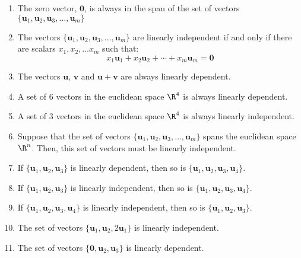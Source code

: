 \documentclass[12pt]{article}
\begin{document}
\begin{enumerate}
\item The zero vector, $\mathbf{0}$, is always in the span of the set of vectors $\{\mathbf{u}_1, \mathbf{u}_2, \mathbf{u}_3,\ldots ,\mathbf{u}_m\}$

\item The vectors $\{\mathbf{u}_1, \mathbf{u}_2, \mathbf{u}_3,\ldots ,\mathbf{u}_m\}$ are linearly independent if and only if there are scalars $x_1, x_2,\ldots x_m$ such that:
\[
x_1\mathbf{u}_1+x_2\mathbf{u}_2+\cdots+x_m\mathbf{u}_m=\mathbf{0}
\]

\item The vectors $\mathbf{u}$, $\mathbf{v}$ and $\mathbf{u}+\mathbf{v}$ are always linearly dependent.

\item A set of $6$ vectors in the euclidean space $\R^4$ is always linearly dependent.

\item A set of $3$ vectors in the euclidean space $\R^4$ is always linearly independent. 

\item Suppose that the set of vectors $\{\mathbf{u}_1, \mathbf{u}_2, \mathbf{u}_3,\ldots ,\mathbf{u}_m\}$ spans the euclidean space $\R^n$. Then, this set of vectors must be linearly independent.

\item If $\{\mathbf{u}_1, \mathbf{u}_2, \mathbf{u}_3\}$ is linearly dependent, then so is $\{\mathbf{u}_1, \mathbf{u}_2, \mathbf{u}_3, \mathbf{u}_4\}$.

\item If $\{\mathbf{u}_1, \mathbf{u}_2, \mathbf{u}_3\}$ is linearly independent, then so is $\{\mathbf{u}_1, \mathbf{u}_2, \mathbf{u}_3, \mathbf{u}_4\}$.

\item If $\{\mathbf{u}_1, \mathbf{u}_2, \mathbf{u}_3, \mathbf{u}_4\}$
is linearly independent, then so is $\{\mathbf{u}_1, \mathbf{u}_2, \mathbf{u}_3\}$.

\item The set of vectors $\{\mathbf{u}_1, \mathbf{u}_2, 2\mathbf{u}_1\}$ is linearly independent.

\item The set of vectors $\{\mathbf{0}, \mathbf{u}_2, \mathbf{u}_3\}$ is linearly dependent.


\end{enumerate}
\end{document}
